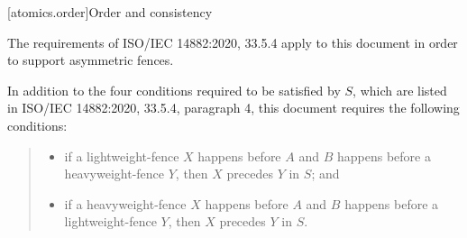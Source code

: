

[atomics.order]{Order and consistency}

The requirements of ISO/IEC 14882:2020, 33.5.4 apply to this document in order to support asymmetric fences.

In addition to the four conditions required to be satisfied by $S$, which are listed in ISO/IEC 14882:2020, 33.5.4, paragraph 4, this document requires the following conditions:

\begin{quote}
\begin{itemize}
\item
if a  lightweight-fence $X$ happens before $A$ and $B$ happens
before a  heavyweight-fence $Y$, then $X$ precedes $Y$ in $S$; and
\item  if a  heavyweight-fence $X$ happens before $A$ and $B$ happens
before a  lightweight-fence $Y$, then $X$ precedes $Y$ in $S$.
\end{itemize}
\end{quote}
